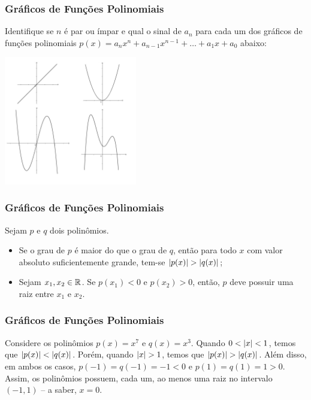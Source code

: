 \documentclass[brazil, notheorems, 10pt]{beamer}
\begin{document}
\begin{frame}
\frametitle{Gráficos de Funções Polinomiais} %
\begin{Exem}
Identifique se $n$ é par ou ímpar e qual o sinal de $a_n$ para cada
um dos gráficos de funções polinomiais $p(x) = a_n x^n+ a_{n-1}
x^{n-1} + \dots + a_1x + a_0$ abaixo:

\begin{center}
\includegraphics[width=5.8cm]{figures/4graf.jpg}
\end{center}
\end{Exem}

\end{frame}

\begin{frame}
\frametitle{Gráficos de Funções Polinomiais} %
 Sejam $p$ e $q$ dois polinômios.

\begin{itemize}
	\item Se o grau de $p$ é maior do
	que o grau de $q$, então para todo $x$ com valor absoluto
	suficientemente grande, tem-se $\left|p(x)\right| > \left|q(x)\right|$;
	\pause
	\item Sejam $x_1, x_2 \in \mathbb{R}$. Se $p(x_1) < 0$ e $p(x_2)>0$,
	então,
	$p$ deve possuir uma raiz entre $x_1$ e $x_2$.
\end{itemize}

\end{frame}

\begin{frame}
\frametitle{Gráficos de Funções Polinomiais} %
\begin{Exem}\label{exemfig}
Considere os polinômios $p(x) = x^7 $ e $q(x)=x^3$. Quando $0< \left|x\right| < 1$, temos que $\left|p(x)\right| < \left|q(x)\right|$. Porém, quando $
\left|x\right| > 1$, temos que $\left|p(x)\right| > \left|q(x)\right|$. Além disso, em
ambos os casos, $p(-1) = q(-1) = -1 <0$ e $p(1) = q(1) = 1 >0$.
Assim, os polinômios possuem, cada um, ao menos uma raiz no
intervalo $(-1, 1)$ -- a saber, $x=0$.

\end{Exem}

\end{frame}
\end{document}
